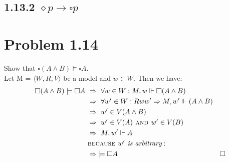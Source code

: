 \documentclass{report}
\begin{document}
	\subsection*{1.13.2 $\diamond p \rightarrow \square p$}
	
	\section*{Problem 1.14}
	Show that $\square (A \wedge B) \models \square A$. \\
	Let M = $\langle W,R,V \rangle$ be a model and $w \in W$. Then we have:
	\begin{align*}
		\square (A \wedge B) \models \square A \ & \Rightarrow \ \forall w \in W: M,w \Vdash \square (A \wedge B) \\
		& \Rightarrow \ \forall w' \in W: Rww' \Rightarrow M,w' \Vdash (A \wedge B) \\
		& \Rightarrow \ w' \in V(A \wedge B) \\
		& \Rightarrow \ w' \in V(A) \textsc{ and } w' \in V(B) \\
		& \Rightarrow \ M,w' \Vdash A \\
		& \textsc{because } w' \textit{ is arbitrary}: \\
		& \Rightarrow \ \models \square A & \square
	\end{align*}
	
\end{document}
